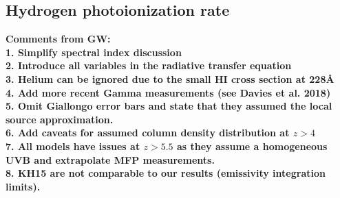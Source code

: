 \documentclass[fleqn,usenatbib]{mnras}
\begin{document}
\subsection{Hydrogen photoionization rate}
\label{sec:gammahi}

\textbf{
Comments from GW:\\
1. Simplify spectral index discussion\\
2. Introduce all variables in the radiative transfer equation\\
3. Helium can be ignored due to the small HI cross section at 228\AA\\
4. Add more recent Gamma measurements (see Davies et al. 2018)\\
5. Omit Giallongo error bars and state that they assumed the local source approximation.\\
6. Add caveats for assumed column density distribution at $z>4$\\
7. All models have issues at $z>5.5$ as they assume a homogeneous UVB and extrapolate MFP measurements.\\
8. KH15 are not comparable to our results (emissivity integration limits). 
}
\end{document}
